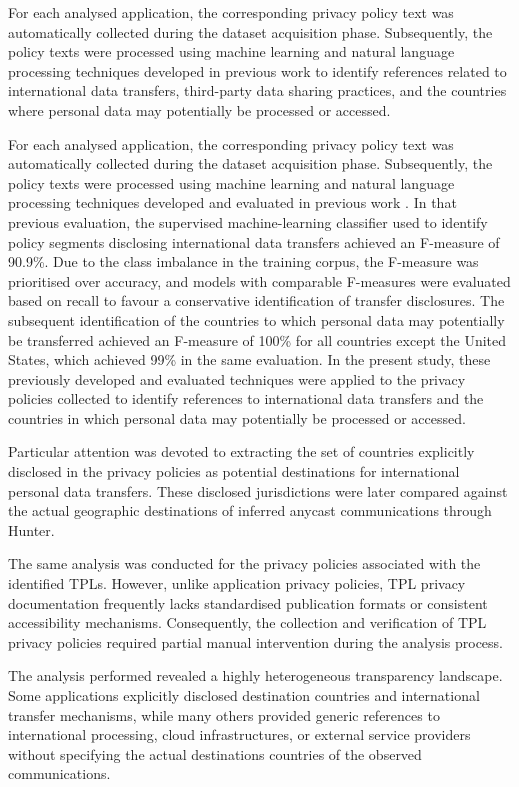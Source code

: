 \documentclass[
A4paper,                %
twoside,                %
openright,              %
chapterprefix=true,     %
12pt,                   %
headings=normal,        %
titlepage=on            %
]{book}
\begin{document}
For each analysed application, the corresponding privacy policy text was automatically collected during the dataset acquisition phase. Subsequently, the policy texts were processed using machine learning and natural language processing techniques developed in previous work \cite{Guaman2023AutomatedApplications} to identify references related to international data transfers, third-party data sharing practices, and the countries where personal data may potentially be processed or accessed.

For each analysed application, the corresponding privacy policy text was automatically collected during the dataset acquisition phase. Subsequently, the policy texts were processed using machine learning and natural language processing techniques developed and evaluated in previous work \cite{Guaman2023AutomatedApplications}. In that previous evaluation, the supervised machine-learning classifier used to identify policy segments disclosing international data transfers achieved an F-measure of 90.9\%. Due to the class imbalance in the training corpus, the F-measure was prioritised over accuracy, and models with comparable F-measures were evaluated based on recall to favour a conservative identification of transfer disclosures. The subsequent identification of the countries to which personal data may potentially be transferred achieved an F-measure of 100\% for all countries except the United States, which achieved 99\% in the same evaluation. In the present study, these previously developed and evaluated techniques were applied to the privacy policies collected to identify references to international data transfers and the countries in which personal data may potentially be processed or accessed.

Particular attention was devoted to extracting the set of countries explicitly disclosed in the privacy policies as potential destinations for international personal data transfers. These disclosed jurisdictions were later compared against the actual geographic destinations of inferred anycast communications through Hunter.

The same analysis was conducted for the privacy policies associated with the identified TPLs. However, unlike application privacy policies, TPL privacy documentation frequently lacks standardised publication formats or consistent accessibility mechanisms. Consequently, the collection and verification of TPL privacy policies required partial manual intervention during the analysis process.

The analysis performed revealed a highly heterogeneous transparency landscape. Some applications explicitly disclosed destination countries and international transfer mechanisms, while many others provided generic references to international processing, cloud infrastructures, or external service providers without specifying the actual destinations countries of the observed communications.
\end{document}
